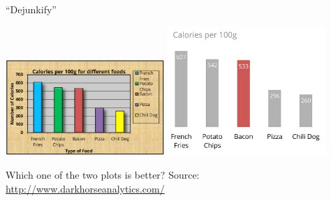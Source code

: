 \documentclass[aspectratio=169]{../latex_main/tntbeamer}  %
\begin{document}
	\begin{frame}{``Dejunkify''}
	    
	    \centering
	    \includegraphics[width=0.45\textwidth]{./figure/bad_figure.png}
	    \includegraphics[width=0.45\textwidth]{./figure/good_figure.png}
	    
	    Which one of the two plots is better?
	    {
        \footnotesize
        Source: \url{http://www.darkhorseanalytics.com/}
        }
	    
	\end{frame}
	
\end{document}
